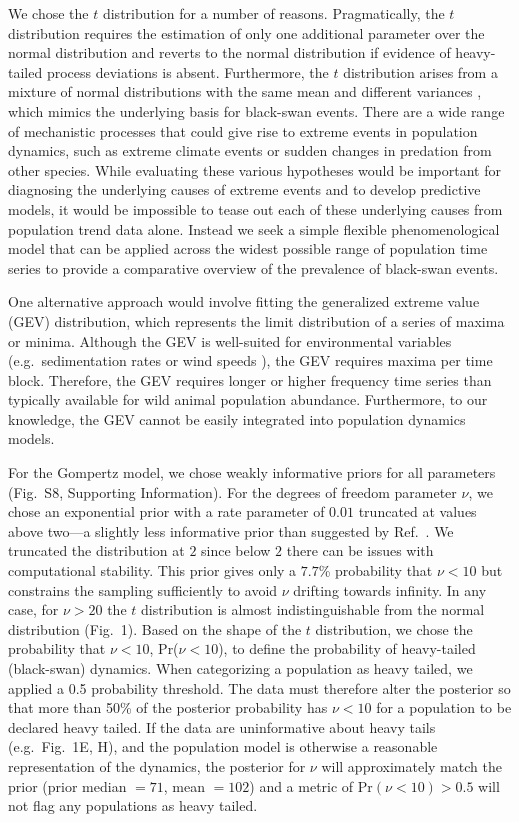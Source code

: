 \documentclass[9pt,twocolumn,twoside]{pnas-new}
\newcommand{\figpriors}{{8}}
\begin{document}
{We chose the $t$ distribution for a number of reasons.
Pragmatically, the $t$ distribution requires the estimation of only one additional
parameter over the normal distribution and reverts to the normal distribution
if evidence of heavy-tailed process deviations is absent.
Furthermore, the $t$ distribution arises from a mixture of normal distributions
with the same mean and different variances \cite{gelman2014},
which mimics the underlying basis for black-swan events.
There are a wide range of mechanistic processes
that could give rise to extreme events in population dynamics,
such as extreme climate events
\cite{meehl2004, katz2005, ipcc2012}
or sudden changes in predation from other species.
While evaluating these various hypotheses
would be important for diagnosing the underlying causes
of extreme events and to develop predictive models,
it would be impossible to tease out each of these
underlying causes from population trend data alone.
Instead we seek a simple flexible phenomenological model
that can be applied across the widest possible
range of population time series to provide a
comparative overview of the prevalence
of black-swan events.

One alternative approach would involve fitting
the generalized extreme value (GEV) distribution,
which represents the limit distribution of a series of maxima or minima.
Although the GEV is well-suited for environmental variables
(e.g.\ sedimentation rates or wind speeds \cite{gaines1993, denny2009}),
the GEV requires maxima per time block.
Therefore, the GEV requires longer or higher frequency time series than typically available
for wild animal population abundance.
Furthermore, to our knowledge, the GEV cannot
be easily integrated into population dynamics models.

For the Gompertz model,
we chose weakly informative priors for
all parameters (Fig.~S\figpriors, Supporting Information).
For the degrees of freedom parameter $\nu$,
we chose an exponential prior
with a rate parameter
of \(0.01\) truncated at values above two---a slightly less informative prior
than suggested by Ref.~\cite{fernandez1998}. We truncated the
distribution at \(2\) since
below $2$ there can be issues with computational stability.
This prior gives only a \(7.7\)\% probability that \(\nu < 10\)
but constrains the sampling sufficiently to avoid \(\nu\) drifting towards infinity. In
any case, for \(\nu > 20\) the $t$ distribution is almost indistinguishable from
the normal distribution (Fig.~1). Based on the shape of the $t$ distribution, we
chose the probability that \(\nu < 10\), Pr(\(\nu < 10\)), to define the
probability of heavy-tailed (black-swan) dynamics. When categorizing a population as heavy
tailed, we applied a 0.5 probability threshold.
The data must therefore alter the posterior so that
more than 50\% of the posterior probability has $\nu < 10$ for a
population to be declared heavy tailed.
If the data
are uninformative about heavy tails (e.g.~Fig.~1E, H),
and the population model is otherwise a reasonable representation of the dynamics,
the posterior for
\(\nu\) will approximately match the prior (prior median \(= 71\), mean \(=
102\)) and a metric of Pr\((\nu < 10) > 0.5\) will not flag any
populations as heavy tailed.

}
\end{document}
